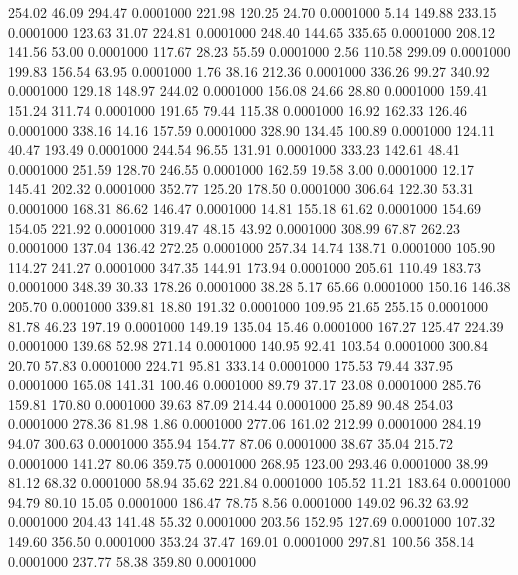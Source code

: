 254.02   46.09  294.47   0.0001000
 221.98  120.25   24.70   0.0001000
   5.14  149.88  233.15   0.0001000
 123.63   31.07  224.81   0.0001000
 248.40  144.65  335.65   0.0001000
 208.12  141.56   53.00   0.0001000
 117.67   28.23   55.59   0.0001000
   2.56  110.58  299.09   0.0001000
 199.83  156.54   63.95   0.0001000
   1.76   38.16  212.36   0.0001000
 336.26   99.27  340.92   0.0001000
 129.18  148.97  244.02   0.0001000
 156.08   24.66   28.80   0.0001000
 159.41  151.24  311.74   0.0001000
 191.65   79.44  115.38   0.0001000
  16.92  162.33  126.46   0.0001000
 338.16   14.16  157.59   0.0001000
 328.90  134.45  100.89   0.0001000
 124.11   40.47  193.49   0.0001000
 244.54   96.55  131.91   0.0001000
 333.23  142.61   48.41   0.0001000
 251.59  128.70  246.55   0.0001000
 162.59   19.58    3.00   0.0001000
  12.17  145.41  202.32   0.0001000
 352.77  125.20  178.50   0.0001000
 306.64  122.30   53.31   0.0001000
 168.31   86.62  146.47   0.0001000
  14.81  155.18   61.62   0.0001000
 154.69  154.05  221.92   0.0001000
 319.47   48.15   43.92   0.0001000
 308.99   67.87  262.23   0.0001000
 137.04  136.42  272.25   0.0001000
 257.34   14.74  138.71   0.0001000
 105.90  114.27  241.27   0.0001000
 347.35  144.91  173.94   0.0001000
 205.61  110.49  183.73   0.0001000
 348.39   30.33  178.26   0.0001000
  38.28    5.17   65.66   0.0001000
 150.16  146.38  205.70   0.0001000
 339.81   18.80  191.32   0.0001000
 109.95   21.65  255.15   0.0001000
  81.78   46.23  197.19   0.0001000
 149.19  135.04   15.46   0.0001000
 167.27  125.47  224.39   0.0001000
 139.68   52.98  271.14   0.0001000
 140.95   92.41  103.54   0.0001000
 300.84   20.70   57.83   0.0001000
 224.71   95.81  333.14   0.0001000
 175.53   79.44  337.95   0.0001000
 165.08  141.31  100.46   0.0001000
  89.79   37.17   23.08   0.0001000
 285.76  159.81  170.80   0.0001000
  39.63   87.09  214.44   0.0001000
  25.89   90.48  254.03   0.0001000
 278.36   81.98    1.86   0.0001000
 277.06  161.02  212.99   0.0001000
 284.19   94.07  300.63   0.0001000
 355.94  154.77   87.06   0.0001000
  38.67   35.04  215.72   0.0001000
 141.27   80.06  359.75   0.0001000
 268.95  123.00  293.46   0.0001000
  38.99   81.12   68.32   0.0001000
  58.94   35.62  221.84   0.0001000
 105.52   11.21  183.64   0.0001000
  94.79   80.10   15.05   0.0001000
 186.47   78.75    8.56   0.0001000
 149.02   96.32   63.92   0.0001000
 204.43  141.48   55.32   0.0001000
 203.56  152.95  127.69   0.0001000
 107.32  149.60  356.50   0.0001000
 353.24   37.47  169.01   0.0001000
 297.81  100.56  358.14   0.0001000
 237.77   58.38  359.80   0.0001000
